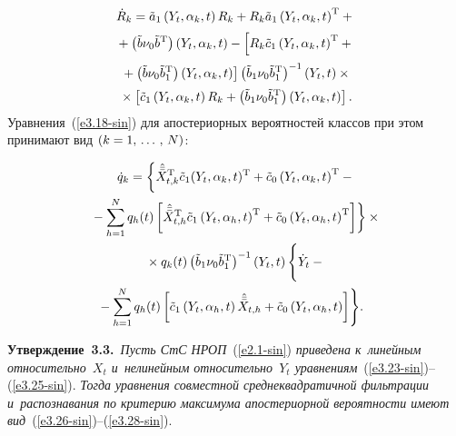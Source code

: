 \begin{multicols}{2}
     \vspace*{-12pt}
     
     \noindent
     \begin{multline}
\dot R_k = \tilde a_1\left(Y_t,\alpha_k,t\right) R_k + R_k \tilde a_1 
\left(Y_t,\alpha_k,t\right)^{\mathrm{T}} +{}\\[2pt]
{}+ \left(\tilde b\nu_0\tilde b^{\mathrm{T}}\right)\left(Y_t,\alpha_k,t\right) -
 \left[ 
 \vphantom{\left(\tilde b\nu_0\tilde b_1^{\mathrm{T}}\right)}
 R_k \tilde c_1\left(Y_t,\alpha_k,t\right)^{\mathrm{T}} + {}\right.\\[2pt]
\left. {}+\left(\tilde b\nu_0\tilde b_1^{\mathrm{T}}\right)\left(Y_t,\alpha_k,t\right)\right] 
\left(\tilde b_1\nu_0\tilde b_1^{\mathrm{T}}\right)^{-1} (Y_t,t)\times{}\\[2pt]
    {}\times \lk \tilde c_1\left(Y_t,\alpha_k,t\right)R_k +
    \left(\tilde b_1\nu_0\tilde b_1^{\mathrm{T}}\right) 
    \left(Y_t,\alpha_k,t\right)\rk.\label{e3.27-sin}
    \end{multline}
Уравнения~(\ref{e3.18-sin}) для апостериорных вероятностей классов при этом
принимают вид $(k=1,\,\ldots\,,\, N)$:

\noindent
\begin{multline}
\dot q_k  = \biggl\{ \hat{\bar{\bar X}}_{t,k}^{\mathrm{T}} \tilde c_1 (Y_t,\alpha_k,t)^{\mathrm{T}} + 
\tilde c_0 \left(Y_t,\alpha_k,t\right)^{\mathrm{T}} -{}\\
{}-\sss_{h=1}^N q_h (t) \lk  \hat{\bar{\bar X}}_{t,h}^{\mathrm{T}} \tilde c_1
\left(Y_t,\alpha_h,t\right)^{\mathrm{T}} + \tilde c_0 \left(Y_t,\alpha_h,t\right)^{\mathrm{T}} \rk\biggr\} \times{}
\\
{}\times q_k (t) \left(\tilde b_1\nu_0\tilde b_1^{\mathrm{T}}\right)^{-1} (Y_t,t)
\left\{
\vphantom{\sss_{h=1}^N}
 \dot Y_t -{}\right.\\
\hspace*{-3mm}\!\!\left.{}-\sss_{h=1}^N q_h(t)\lk \tilde c_1\left(Y_t,\alpha_h,t\right)\hat{\bar{\bar X}}_{t,h}
    + \tilde c_0\left(Y_t,\alpha_h,t\right)\rk \right\}\!.\!
     \label{e3.28-sin}
    \end{multline}


\noindent
\textbf{Утверждение~3.3.}\ \textit{Пусть СтС НРОП}~(\ref{e2.1-sin}) 
\textit{приведена к~линейным относительно~$X_t$ и~нелинейным относительно~$Y_t$ 
уравнениям}~(\ref{e3.23-sin})--(\ref{e3.25-sin}). 
\textit{Тогда уравнения совместной среднеквадратичной фильт\-ра\-ции и~распознавания 
по критерию максимума апостериорной вероятности имеют вид}~(\ref{e3.26-sin})--(\ref{e3.28-sin}).


\end{multicols}
